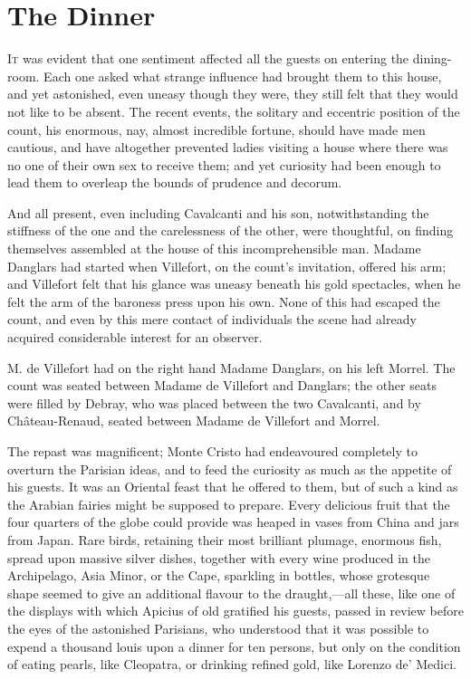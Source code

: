 \chapter{The Dinner} 

 \lettrine{I}{t} was evident that one sentiment affected all the guests on entering the dining-room. Each one asked what strange influence had brought them to this house, and yet astonished, even uneasy though they were, they still felt that they would not like to be absent. The recent events, the solitary and eccentric position of the count, his enormous, nay, almost incredible fortune, should have made men cautious, and have altogether prevented ladies visiting a house where there was no one of their own sex to receive them; and yet curiosity had been enough to lead them to overleap the bounds of prudence and decorum. 

 And all present, even including Cavalcanti and his son, notwithstanding the stiffness of the one and the carelessness of the other, were thoughtful, on finding themselves assembled at the house of this incomprehensible man. Madame Danglars had started when Villefort, on the count's invitation, offered his arm; and Villefort felt that his glance was uneasy beneath his gold spectacles, when he felt the arm of the baroness press upon his own. None of this had escaped the count, and even by this mere contact of individuals the scene had already acquired considerable interest for an observer. 

 M. de Villefort had on the right hand Madame Danglars, on his left Morrel. The count was seated between Madame de Villefort and Danglars; the other seats were filled by Debray, who was placed between the two Cavalcanti, and by Château-Renaud, seated between Madame de Villefort and Morrel. 

 The repast was magnificent; Monte Cristo had endeavoured completely to overturn the Parisian ideas, and to feed the curiosity as much as the appetite of his guests. It was an Oriental feast that he offered to them, but of such a kind as the Arabian fairies might be supposed to prepare. Every delicious fruit that the four quarters of the globe could provide was heaped in vases from China and jars from Japan. Rare birds, retaining their most brilliant plumage, enormous fish, spread upon massive silver dishes, together with every wine produced in the Archipelago, Asia Minor, or the Cape, sparkling in bottles, whose grotesque shape seemed to give an additional flavour to the draught,—all these, like one of the displays with which Apicius of old gratified his guests, passed in review before the eyes of the astonished Parisians, who understood that it was possible to expend a thousand louis upon a dinner for ten persons, but only on the condition of eating pearls, like Cleopatra, or drinking refined gold, like Lorenzo de' Medici. 

